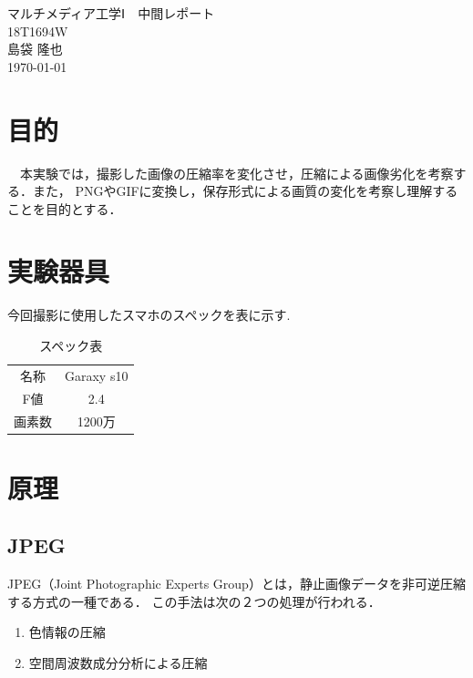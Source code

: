 \documentclass[a4paper,11pt]{bxjsarticle}
\begin{document}
\begin{titlepage}
  \begin{center}
    \vspace*{150truept}
    {\Huge マルチメディア工学Ⅰ　中間レポート}\\ %
    \vspace{120truept}
    {\huge 18T1694W}\\ %
    \vspace{50truept}
    {\huge 島袋 隆也}\\ %
    \vspace{50truept}
    {\huge \today}\\ %
  \end{center}
\end{titlepage}


\section{目的}
　本実験では，撮影した画像の圧縮率を変化させ，圧縮による画像劣化を考察する．また，
PNGやGIFに変換し，保存形式による画質の変化を考察し理解することを目的とする．


\section{実験器具}
  今回撮影に使用したスマホのスペックを表に示す. 
  \begin{table}[htb]
    \begin{center}
      \caption{スペック表}
      \begin{tabular}{|c|c|} \hline
        名称 & Garaxy s10  \\
        F値 & 2.4  \\
        画素数 & 1200万  \\ \hline

      \end{tabular}
      \label{tab:price}
    \end{center}
  \end{table}

\section{原理}
\subsection{JPEG}
JPEG（Joint Photographic Experts Group）とは，静止画像データを非可逆圧縮する方式の一種である．
この手法は次の２つの処理が行われる．
\begin{enumerate}
  \item 色情報の圧縮
  \item 空間周波数成分分析による圧縮
\end{enumerate}
\end{document}

